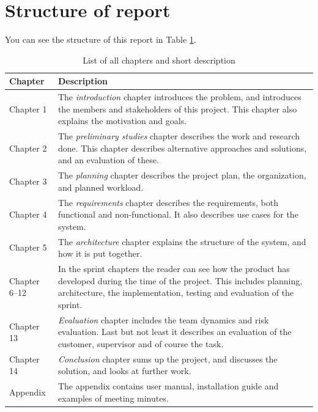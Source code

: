 \section{Structure of report}
You can see the structure of this report in Table \ref{tab:structure_of_report}.
\begin{table}[!ht]\centering
\caption{List of all chapters and short description}
\label{tab:structure_of_report}
\def\arraystretch{1.3}
\begin{tabularx}{\textwidth}{lX} \toprule[0.5mm]
\textbf{Chapter} & \textbf{Description} \\ \midrule
Chapter 1 & The \emph{introduction} chapter introduces the problem, and introduces the members and stakeholders of this project.
This chapter also explains the motivation and goals. \\

Chapter 2 &  The \emph{preliminary studies} chapter describes the work and research done. This chapter describes alternative approaches and solutions, and an evaluation of these. \\

Chapter 3 &  The \emph{planning} chapter describes the project plan, the organization, and planned workload.  \\

Chapter 4 &  The \emph{requirements} chapter describes the requirements, both functional and non-functional. It also describes use cases for the system. \\

Chapter 5	 &  The \emph{architecture} chapter explains the structure of the system, and how it is put together. \\

Chapter 6--12 	&  In the sprint chapters the reader can see how the product has developed during the time of the project. This includes planning, architecture, the implementation, testing and evaluation of the sprint. \\

Chapter 13 	 &  \emph{Evaluation} chapter includes the team dynamics and risk evaluation. Last but not least it describes an evaluation of the customer, supervisor and of course the task. \\

Chapter 14 	 &  \emph{Conclusion} chapter sums up the project, and discusses the solution, and looks at further work. \\

\midrule
Appendix 	 &   The appendix contains user manual, installation guide and examples of meeting minutes.\\

\bottomrule[0.5mm]
\end{tabularx}
\end{table}

